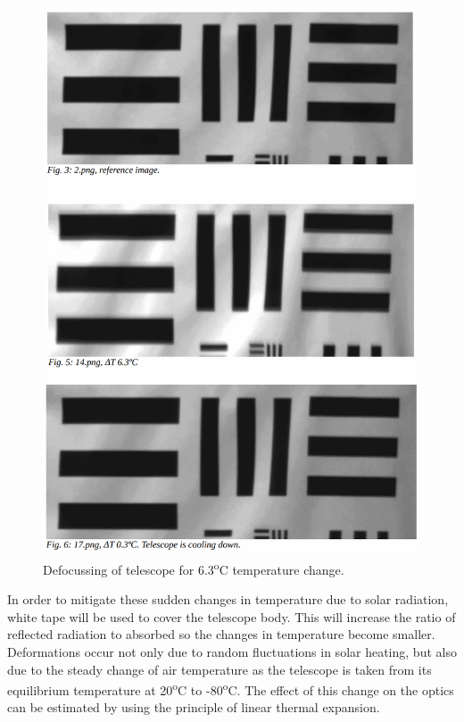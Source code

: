 	\begin{figure}[H]
    \centering	
	\includegraphics[scale=0.2]{4-experiment-design/img/mechanical/focusdrift.png}
	\caption{Defocussing of telescope for 6.3\textsuperscript{o}C temperature change.}
	\label{fig:focusdrift}
    	\end{figure}
 
In order to mitigate these sudden changes in temperature due to solar radiation, white tape will be used to cover the telescope body. This will increase the ratio of reflected radiation to absorbed so the changes in temperature become smaller.\\

Deformations occur not only due to random fluctuations in solar heating, but also due to the steady change of air temperature as the telescope is taken from its equilibrium temperature at 20\textsuperscript{o}C to -80\textsuperscript{o}C. The effect of this change on the optics can be estimated by using the principle of linear thermal expansion.

